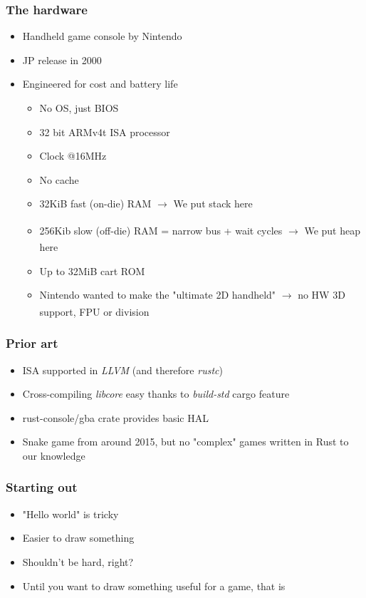 \documentclass{beamer}
\begin{document}
\begin{frame}
	\frametitle{The hardware}
	\begin{itemize}
		\item Handheld game console by Nintendo
		\item JP release in 2000
		\item Engineered for cost and battery life \begin{itemize}
			      \item No OS, just BIOS
			      \item 32 bit ARMv4t ISA processor
			      \item Clock @16MHz
			      \item No cache
			      \item 32KiB fast (on-die) RAM $\xrightarrow[]{}$ We put stack here
			      \item 256Kib slow (off-die) RAM = narrow bus + wait cycles $\xrightarrow[]{}$ We put heap here
			      \item Up to 32MiB cart ROM
			      \item Nintendo wanted to make the "ultimate 2D handheld" $\xrightarrow[]{}$ no HW 3D support, FPU or division
		      \end{itemize}
	\end{itemize}
\end{frame}

\begin{frame}
	\frametitle{Prior art}
	\begin{itemize}
		\item ISA supported in \emph{LLVM} (and therefore \emph{rustc})
		\item Cross-compiling \emph{libcore} easy thanks to \emph{build-std} cargo feature
		\item rust-console/gba crate provides basic HAL
		\item Snake game from around 2015, but no "complex" games written in Rust to our knowledge
	\end{itemize}
\end{frame}

\begin{frame}
	\frametitle{Starting out}
	\begin{itemize}
		\item "Hello world" is tricky
		\item Easier to draw something
		\item Shouldn't be hard, right?
		\item Until you want to draw something useful for a game, that is
	\end{itemize}
\end{frame}
\end{document}
